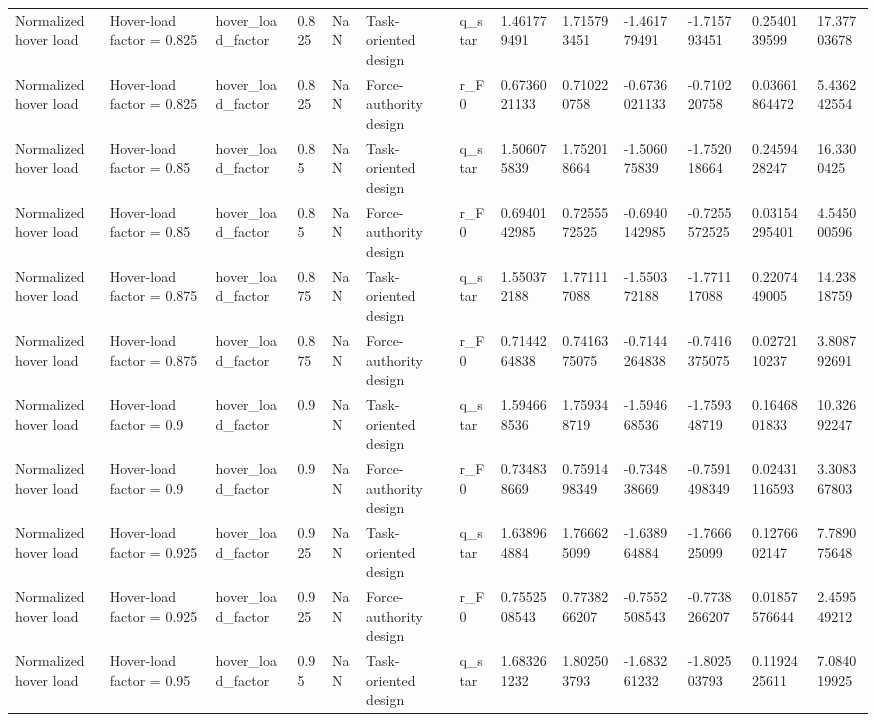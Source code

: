 \begin{tabular}{@{}lllllllllllll@{}}
Normalized hover load & Hover-load factor = 0.825 & hover\_load\_factor & 0.825 & NaN & Task-oriented design & q\_star & 1.461779491 & 1.715793451 & -1.461779491 & -1.715793451 & 0.2540139599 & 17.37703678 \\
Normalized hover load & Hover-load factor = 0.825 & hover\_load\_factor & 0.825 & NaN & Force-authority design & r\_F0 & 0.6736021133 & 0.710220758 & -0.6736021133 & -0.710220758 & 0.03661864472 & 5.436242554 \\
Normalized hover load & Hover-load factor = 0.85 & hover\_load\_factor & 0.85 & NaN & Task-oriented design & q\_star & 1.506075839 & 1.752018664 & -1.506075839 & -1.752018664 & 0.2459428247 & 16.3300425 \\
Normalized hover load & Hover-load factor = 0.85 & hover\_load\_factor & 0.85 & NaN & Force-authority design & r\_F0 & 0.6940142985 & 0.7255572525 & -0.6940142985 & -0.7255572525 & 0.03154295401 & 4.545000596 \\
Normalized hover load & Hover-load factor = 0.875 & hover\_load\_factor & 0.875 & NaN & Task-oriented design & q\_star & 1.550372188 & 1.771117088 & -1.550372188 & -1.771117088 & 0.2207449005 & 14.23818759 \\
Normalized hover load & Hover-load factor = 0.875 & hover\_load\_factor & 0.875 & NaN & Force-authority design & r\_F0 & 0.7144264838 & 0.7416375075 & -0.7144264838 & -0.7416375075 & 0.0272110237 & 3.808792691 \\
Normalized hover load & Hover-load factor = 0.9 & hover\_load\_factor & 0.9 & NaN & Task-oriented design & q\_star & 1.594668536 & 1.759348719 & -1.594668536 & -1.759348719 & 0.1646801833 & 10.32692247 \\
Normalized hover load & Hover-load factor = 0.9 & hover\_load\_factor & 0.9 & NaN & Force-authority design & r\_F0 & 0.734838669 & 0.7591498349 & -0.734838669 & -0.7591498349 & 0.02431116593 & 3.308367803 \\
Normalized hover load & Hover-load factor = 0.925 & hover\_load\_factor & 0.925 & NaN & Task-oriented design & q\_star & 1.638964884 & 1.766625099 & -1.638964884 & -1.766625099 & 0.1276602147 & 7.789075648 \\
Normalized hover load & Hover-load factor = 0.925 & hover\_load\_factor & 0.925 & NaN & Force-authority design & r\_F0 & 0.7552508543 & 0.7738266207 & -0.7552508543 & -0.7738266207 & 0.01857576644 & 2.459549212 \\
Normalized hover load & Hover-load factor = 0.95 & hover\_load\_factor & 0.95 & NaN & Task-oriented design & q\_star & 1.683261232 & 1.802503793 & -1.683261232 & -1.802503793 & 0.1192425611 & 7.084019925 \\

\end{tabular}
